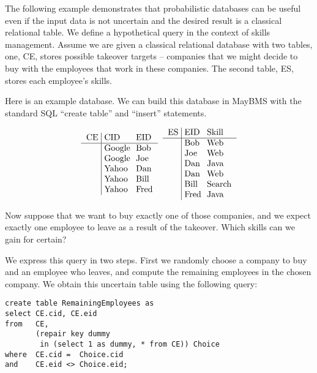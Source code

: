 The following example demonstrates that probabilistic databases can be useful
even if the input data is not uncertain and the desired result is a classical
relational table. We define a hypothetical query in the context of skills
management. Assume we are given a classical relational database with two
tables, one, CE, stores possible takeover targets -- companies that we might
decide to buy with the employees that work in these companies.
The second table, ES, stores each employee's skills.

Here is an example database. We can build this database in MayBMS with the
standard SQL ``create table'' and ``insert'' statements.

\[
\begin{tabular}{l@{~}|@{~}l@{~~}l}
CE & CID & EID \\
\hline
  & Google & Bob  \\
  & Google & Joe  \\
  & Yahoo  & Dan  \\
  & Yahoo  & Bill \\
  & Yahoo  & Fred \\
\end{tabular}
\hspace{2mm}
\begin{tabular}{l@{~}|@{~}l@{~~}l}
ES & EID & Skill \\
\hline
  & Bob  & Web \\
  & Joe  & Web \\
  & Dan  & Java \\
  & Dan  & Web \\
  & Bill & Search \\
  & Fred & Java \\
\end{tabular}
\]


Now suppose that we want to buy exactly one of those companies, and
we expect exactly one employee to leave as a result of the takeover.
Which skills can we gain for certain?

We express this query in two steps. First we randomly choose a
company to buy and an employee who leaves, and compute the remaining
employees in the chosen company. We obtain this uncertain table using the
following query:
%
\begin{verbatim}
create table RemainingEmployees as
select CE.cid, CE.eid
from   CE,
       (repair key dummy
        in (select 1 as dummy, * from CE)) Choice
where  CE.cid =  Choice.cid
and    CE.eid <> Choice.eid;
\end{verbatim}

